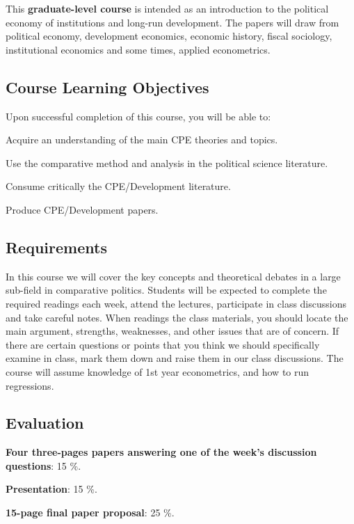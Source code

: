 \documentclass[letterpaper]{article}
\renewenvironment{itemize}{
  \begin{list}{}{
    \setlength{\leftmargin}{1.5em}
  }
}{
  \end{list}
}
\begin{document}
This {\bf {\color{blue}graduate-level course}} is intended as an introduction to the political economy of institutions and long-run development. The papers will draw from political economy, development economics, economic history, fiscal sociology, institutional economics and some times, applied econometrics. 



\subsection*{Course Learning Objectives}
 
Upon successful completion of this course, you will be able to:

\begin{itemize}
	\item[$\bullet$] Acquire an understanding of the main CPE theories and topics.
	\item[$\bullet$] Use the comparative method and analysis in the political science literature.
	\item[$\bullet$] Consume critically the CPE/Development literature.
	\item[$\bullet$] Produce CPE/Development papers.
\end{itemize}



\subsection*{Requirements}

In this course we will cover the key concepts and theoretical debates in a large sub-field in comparative politics. Students will be expected to complete the required readings each week, attend the lectures, participate in class discussions and take careful notes. When readings the class materials, you should locate the main argument, strengths, weaknesses, and other issues that are of concern. If there are certain questions or points that you think we should specifically examine in class, mark them down and raise them in our class discussions. The course will assume knowledge of 1st year econometrics, and how to run regressions.

\subsection*{Evaluation}


\begin{itemize}
	\item[$\bullet$] {\bf Four three-pages papers answering one of the week's discussion questions}: 15 \%.
	\item[$\bullet$] {\bf Presentation}: 15 \%.
	\item[$\bullet$] {\bf 15-page final paper proposal}: 25 \%.
\end{itemize}
\end{document}
